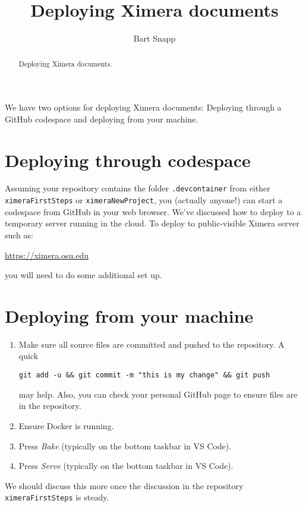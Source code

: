 \documentclass{ximera}
\title{Deploying Ximera documents}
\author{Bart Snapp}
\begin{document}
\begin{abstract}
    Deploying Ximera documents.
\end{abstract}
\maketitle

We have two options for deploying Ximera documents: Deploying through a GitHub
codespace and deploying from your machine.

\section{Deploying through codespace}

Assuming your repository contains the folder \verb!.devcontainer! from either
\verb!ximeraFirstSteps! or \verb!ximeraNewProject!, you (actually anyone!) can
start a codespace from GitHub in your web browser. We've discussed how to
deploy to a temporary  server running in the cloud. To deploy to public-visible
Ximera server such as:
\begin{center}
    \url{https://ximera.osu.edu}
\end{center}
you will need to do some additional set up. 

\section{Deploying from your machine}

\begin{enumerate}
    \item Make sure all source files are committed and pushed to the
          repository. A quick
\begin{verbatim}
git add -u && git commit -m "this is my change" && git push
\end{verbatim}
          may help. Also, you can check your personal GitHub page to ensure
          files are in
          the repository.
    \item Ensure Docker is running.
    \item Press \textit{Bake} (typically on the bottom taskbar in VS Code).
    \item Press \textit{Serve} (typically on the bottom taskbar in VS Code).
\end{enumerate}

We should discuss this more once the discussion in the repository
\verb!ximeraFirstSteps! is steady.
\end{document}

